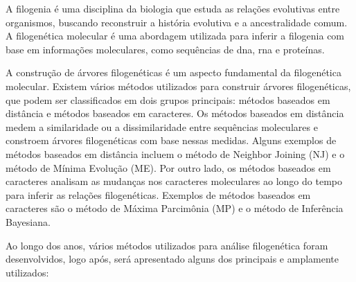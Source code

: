 A filogenia é uma disciplina da biologia que estuda as relações evolutivas entre organismos, buscando reconstruir a história evolutiva e a ancestralidade comum. A filogenética molecular é uma abordagem utilizada para inferir a filogenia com base em informações moleculares, como sequências de \gls{dna}, \gls{rna} e proteínas\cite{felsenstein_inferring_2004}.

A construção de árvores filogenéticas é um aspecto fundamental da filogenética molecular. Existem vários métodos utilizados para construir árvores filogenéticas, que podem ser classificados em dois grupos principais: métodos baseados em distância e métodos baseados em caracteres.
Os métodos baseados em distância medem a similaridade ou a dissimilaridade entre sequências moleculares e constroem árvores filogenéticas com base nessas medidas. Alguns exemplos de métodos baseados em distância incluem o método de Neighbor Joining (NJ) e o método de Mínima Evolução (ME).
Por outro lado, os métodos baseados em caracteres analisam as mudanças nos caracteres moleculares ao longo do tempo para inferir as relações filogenéticas. Exemplos de métodos baseados em caracteres são o método de Máxima Parcimônia (MP) e o método de Inferência Bayesiana\cite{swofford_phylogenetic_1996}.

Ao longo dos anos, vários métodos utilizados para análise filogenética foram desenvolvidos, logo após, será apresentado alguns dos principais e amplamente utilizados:

